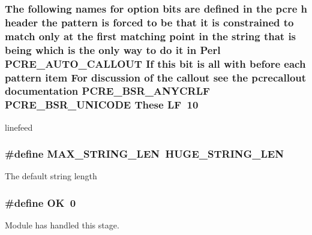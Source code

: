 \subsubsection[{\texorpdfstring{LF}{LF}}]{\setlength{\rightskip}{0pt plus 5cm}The following {\bf names} for {\bf option} bits {\bf are} {\bf defined} {\bf in} the {\bf pcre} {\bf h} header the {\bf pattern} {\bf is} forced {\bf to} {\bf be} that {\bf it} {\bf is} constrained {\bf to} {\bf match} only at the {\bf first} {\bf matching} {\bf point} {\bf in} the {\bf string} that {\bf is} being {\bf which} {\bf is} the only {\bf way} {\bf to} {\bf do} {\bf it} {\bf in} {\bf Perl} {\bf P\+C\+R\+E\+\_\+\+A\+U\+T\+O\+\_\+\+C\+A\+L\+L\+O\+UT} If {\bf this} {\bf bit} {\bf is} {\bf all} {\bf with} before each {\bf pattern} {\bf item} For discussion {\bf of} the callout see the pcrecallout {\bf documentation} {\bf P\+C\+R\+E\+\_\+\+B\+S\+R\+\_\+\+A\+N\+Y\+C\+R\+LF} {\bf P\+C\+R\+E\+\_\+\+B\+S\+R\+\_\+\+U\+N\+I\+C\+O\+DE} These LF~10}\hypertarget{group__APACHE__CORE__DAEMON_gacdd2e847ca4860289abebda77d2b3c19}{}\label{group__APACHE__CORE__DAEMON_gacdd2e847ca4860289abebda77d2b3c19}
linefeed 
\subsubsection[{\texorpdfstring{M\+A\+X\+\_\+\+S\+T\+R\+I\+N\+G\+\_\+\+L\+EN}{MAX_STRING_LEN}}]{\setlength{\rightskip}{0pt plus 5cm}\#define M\+A\+X\+\_\+\+S\+T\+R\+I\+N\+G\+\_\+\+L\+EN~{\bf H\+U\+G\+E\+\_\+\+S\+T\+R\+I\+N\+G\+\_\+\+L\+EN}}\hypertarget{group__APACHE__CORE__DAEMON_ga4fa9aad0e9c7cc2e344b679cdbb2b67d}{}\label{group__APACHE__CORE__DAEMON_ga4fa9aad0e9c7cc2e344b679cdbb2b67d}
The default string length 
\subsubsection[{\texorpdfstring{OK}{OK}}]{\setlength{\rightskip}{0pt plus 5cm}\#define OK~0}\hypertarget{group__APACHE__CORE__DAEMON_gaba51915c87d64af47fb1cc59348961c9}{}\label{group__APACHE__CORE__DAEMON_gaba51915c87d64af47fb1cc59348961c9}
Module has handled this stage. 
